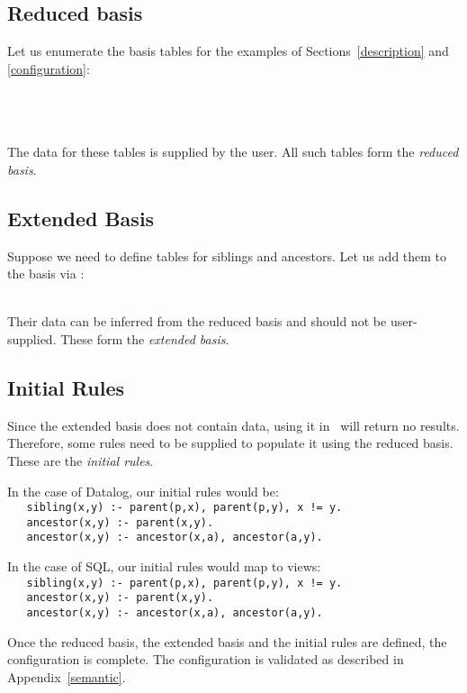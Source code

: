 \subsection{Reduced basis}
\label{reducedbasis} 
Let us enumerate the basis tables for the examples of Sections~\ref{description} and \ref{configuration}: \\
{\small
	\\
	\\
	\\
}

The data for these tables is supplied by the user. All such tables form the  {\em reduced basis}.

\subsection{Extended Basis}
\label{extendedbasis} 
Suppose we need to define tables for siblings and ancestors. %
Let us add them to the basis via \dcl:\\
{\small
	\\
}

Their data can be inferred from the reduced basis and should not be user-supplied. These form the {\em extended basis}.

\subsection{Initial Rules}
\label{datalogrules}

Since the extended basis does not contain data, using it in \dsl~will return no results. 
Therefore, some rules need to be supplied to populate it using the reduced basis. These are the {\em initial rules}. 

In the case of Datalog, our initial rules would be:\\
{\small
	\texttt{\phantom{1}~~~sibling(x,y) :- parent(p,x),~parent(p,y),~x != y.}\\
	\texttt{\phantom{1}~~~ancestor(x,y) :- parent(x,y).}\\
	\texttt{\phantom{1}~~~ancestor(x,y) :- ancestor(x,a), ancestor(a,y).}
}

In the case of SQL, our initial rules would map to views:\\
{\small
	\texttt{\phantom{1}~~~sibling(x,y) :- parent(p,x),~parent(p,y),~x != y.}\\
	\texttt{\phantom{1}~~~ancestor(x,y) :- parent(x,y).}\\
	\texttt{\phantom{1}~~~ancestor(x,y) :- ancestor(x,a), ancestor(a,y).}
}

Once the reduced basis, the extended basis and the initial rules are defined, the configuration is complete. The configuration is validated as described in Appendix~\ref{semantic}.

